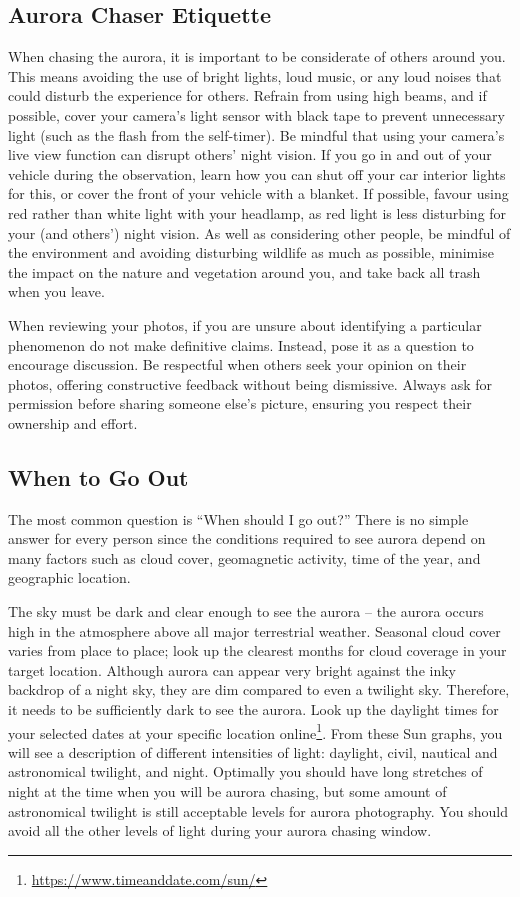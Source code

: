 \documentclass{article}
\newcommand{\contributed}[1]{%
    \par\noindent
    \begingroup
    \setlength{\leftskip}{1em}%
    \itshape
    Contributors: #1
    \par
    \endgroup
    \vspace{0.5em}
}
\begin{document}
\subsection{Aurora Chaser Etiquette}
When chasing the aurora, it is important to be considerate of others around you. This means avoiding the use of bright lights, loud music, or any loud noises that could disturb the experience for others. Refrain from using high beams, and if possible, cover your camera's light sensor with black tape to prevent unnecessary light (such as the flash from the self-timer). Be mindful that using your camera’s live view function can disrupt others' night vision. If you go in and out of your vehicle during the observation, learn how you can shut off your car interior lights for this, or cover the front of your vehicle with a blanket. If possible, favour using red rather than white light with your headlamp, as red light is less disturbing for your (and others') night vision. As well as considering other people, be mindful of the environment and avoiding disturbing wildlife as much as possible, minimise the impact on the nature and vegetation around you, and take back all trash when you leave.

When reviewing your photos, if you are unsure about identifying a particular phenomenon do not make definitive claims. Instead, pose it as a question to encourage discussion. Be respectful when others seek your opinion on their photos, offering constructive feedback without being dismissive. Always ask for permission before sharing someone else's picture, ensuring you respect their ownership and effort.

\subsection{When to Go Out}\label{whentogoout}
The most common question is ``When should I go out?'' There is no simple answer for every person since the conditions required to see aurora depend on many factors such as cloud cover, geomagnetic activity, time of the year, and geographic location.

The sky must be dark and clear enough to see the aurora -- the aurora occurs high in the atmosphere above all major terrestrial weather. Seasonal cloud cover varies from place to place; look up the clearest months for cloud coverage in your target location. Although aurora can appear very bright against the inky backdrop of a night sky, they are dim compared to even a twilight sky. Therefore, it needs to be sufficiently dark to see the aurora. Look up the daylight times for your selected dates at your specific location online\footnote{\url{https://www.timeanddate.com/sun/}}. From these Sun graphs, you will see a description of different intensities of light: daylight, civil, nautical and astronomical twilight, and night. Optimally you should have long stretches of night at the time when you will be aurora chasing, but some amount of astronomical twilight is still acceptable levels for aurora photography. You should avoid all the other levels of light during your aurora chasing window.
\end{document}
